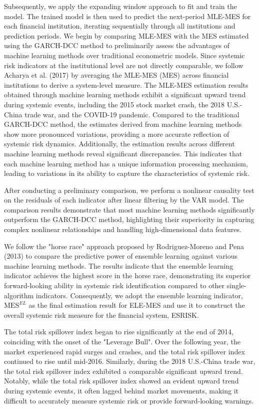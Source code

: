 \documentclass[12pt,a4paper]{article}
\begin{document}
    Subsequently, we apply the expanding window approach to fit and train the model. The trained model is then used to predict the next-period MLE-MES for each financial institution, iterating sequentially through all institutions and prediction periods. We begin by comparing MLE-MES with the MES estimated using the GARCH-DCC method to preliminarily assess the advantages of machine learning methods over traditional econometric models. Since systemic risk indicators at the institutional level are not directly comparable, we follow Acharya et al. (2017) by averaging the MLE-MES (MES) across financial institutions to derive a system-level measure. The MLE-MES estimation results obtained through machine learning methods exhibit a significant upward trend during systemic events, including the 2015 stock market crash, the 2018 U.S.-China trade war, and the COVID-19 pandemic. Compared to the traditional GARCH-DCC method, the estimates derived from machine learning methods show more pronounced variations, providing a more accurate reflection of systemic risk dynamics. Additionally, the estimation results across different machine learning methods reveal significant discrepancies. This indicates that each machine learning method has a unique information processing mechanism, leading to variations in its ability to capture the characteristics of systemic risk.

    After conducting a preliminary comparison, we perform a nonlinear causality test on the residuals of each indicator after linear filtering by the VAR model. The comparison results demonstrate that most machine learning methods significantly outperform the GARCH-DCC method, highlighting their superiority in capturing complex nonlinear relationships and handling high-dimensional data features.

    We follow the "horse race" approach proposed by Rodriguez-Moreno and Pena (2013) to compare the predictive power of ensemble learning against various machine learning methods. The results indicate that the ensemble learning indicator achieves the highest score in the horse race, demonstrating its superior forward-looking ability in systemic risk identification compared to other single-algorithm indicators. Consequently, we adopt the ensemble learning indicator, $\mathrm{MES}^{EL}$ as the final estimation result for ELE-MES and use it to construct the overall systemic risk measure for the financial system, ESRISK.

    The total risk spillover index began to rise significantly at the end of 2014, coinciding with the onset of the "Leverage Bull". Over the following year, the market experienced rapid surges and crashes, and the total risk spillover index continued to rise until mid-2016. Similarly, during the 2018 U.S.-China trade war, the total risk spillover index exhibited a comparable significant upward trend. Notably, while the total risk spillover index showed an evident upward trend during systemic events, it often lagged behind market movements, making it difficult to accurately measure systemic risk or provide forward-looking warnings.
\end{document}
